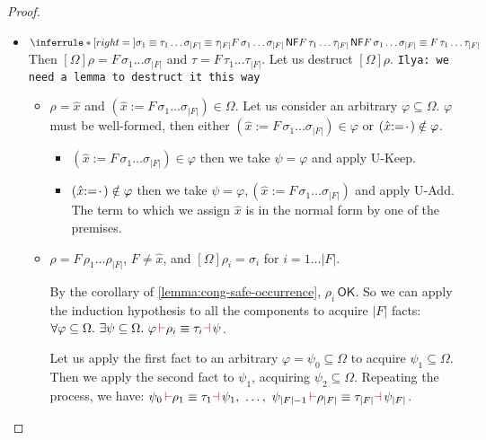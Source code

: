 \documentclass[a4,natbib=false]{article}
\newcommand{\ilyam}[1]{{\color{red} \texttt{Ilya:  #1}}}
\newcommand{\ctxtapp}[2]{[{#1}] {#2}}
\newcommand{\evarassign}[2]{({#1} \mathsf{:=} {#2})}
\newcommand{\spcdot}{\mkern 2mu\cdot\mkern 2mu}
\newcommand{\narg}[1]{|{#1}|}
\newcommand{\judgeequivunt}[2]{{#1} \equiv {#2}}
\newcommand{\judgeunify}[4]{{#1}\,{\color{purple}\vdash} {#2} \equiv {#3} {\color{purple}\dashv}\,{#4}}
\newcommand{\judgeSnf}[1]{{#1}\,\mathsf{NF}}
\newcommand{\judgeSokterm}[1]{{#1} \,\mathsf{OK}}
\newcommand{\fullterm}[2]{{#1}\,#2_1 \dots #2_{\narg{#1}}}
\newcommand{\Infer}[3]{\inferrule*[right={#1}]{#2}{#3}}
\begin{document}
\begin{proof}
\begin{itemize}
  \item
    $
    \Infer{}
    {
      \judgeequivunt{\sigma_1}{\tau_1} \\
      \dots\\
      \judgeequivunt{\sigma_{\narg{F}}}{\tau_{\narg{F}}} \\
      \judgeSnf{\fullterm{F}{\sigma}} \\
      \judgeSnf{\fullterm{F}{\tau}}
    }
    {
      \judgeequivunt{\fullterm{F}{\sigma}}{\fullterm{F}{\tau}}
    }
    $
    Then $\ctxtapp{\Omega}{\rho} = \fullterm{F}{\sigma}$ and $\tau =
    \fullterm{F}{\tau}$.
    Let us destruct $\ctxtapp{\Omega}{\rho}$. \ilyam{we need a lemma to destruct
    it this way}
    \begin{itemize}
      \item $\rho = \hat{x}$ and $\evarassign{\hat{x}}{\fullterm{F}{\sigma}} \in
        \Omega$. Let us consider an arbitrary $\varphi \subseteq \Omega$.
        $\varphi$ must be well-formed, then either $\evarassign{\hat{x}}{\fullterm{F}{\sigma}} \in
        \varphi$ or $\evarassign{\hat{x}}{\spcdot} \notin \varphi$.
        \begin{itemize}
        \item $\evarassign{\hat{x}}{\fullterm{F}{\sigma}} \in \varphi$ then we
          take $\psi = \varphi$ and apply U-Keep. 
        \item $\evarassign{\hat{x}}{\spcdot} \notin \varphi$ then we
          take $\psi = \varphi, \evarassign{\hat{x}}{\fullterm{F}{\sigma}}$
          and apply U-Add. The term to which we assign $\hat{x}$ is in the normal form by one
          of the premises. 
        \end{itemize}
      \item $\rho = \fullterm{F}{\rho}$, $F \neq \hat{x}$, and
        $\ctxtapp{\Omega}{\rho_i} = \sigma_i$ for $i = 1\dots\narg{F}$.

        By the corollary of \cref{lemma:cong-safe-occurrence},
        $\judgeSokterm{\rho_i}$. So we can apply the induction hypothesis to all
        the components to acquire $\narg{F}$ facts: $\forall \varphi \subseteq \Omega.
        ~ \exists \psi \subseteq \Omega. ~ \judgeunify{\varphi}{\rho_i}{\tau_i}{\psi}$.

        Let us apply the first fact to an arbitrary $\varphi = \psi_0 \subseteq
        \Omega$ to acquire $\psi_1 \subseteq \Omega$. Then we apply the second
        fact to $\psi_1 $, acquiring $\psi_2 \subseteq \Omega$. Repeating the process, we have:
        $\judgeunify{\psi_0}{\rho_1}{\tau_1}{\psi_1}, ~ \dots, ~
        \judgeunify{\psi_{\narg{F}-1}}{\rho_{\narg{F}}}{\tau_{\narg{F}}}{\psi_{\narg{F}}}$.


\end{itemize}
\end{itemize}
\end{proof}
\end{document}
